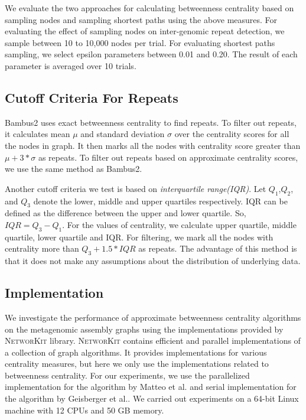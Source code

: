 \documentclass[runningheads,a4paper]{llncs}
\begin{document}
We evaluate the two approaches for calculating betweenness centrality based on sampling nodes and sampling shortest paths using the above measures.
For evaluating the effect of sampling nodes on inter-genomic repeat detection, we sample between 10 to 10,000 nodes per trial.
For evaluating shortest paths sampling, we select epsilon parameters between 0.01 and 0.20.
The result of each parameter is averaged over 10 trials.


\subsection*{Cutoff Criteria For Repeats}
Bambus2\cite{bambus} uses exact betweenness centrality to find repeats. To filter out repeats, it calculates mean $\mu$ and standard deviation $\sigma$ over the centrality scores for all the nodes in graph. It then marks all the nodes with centrality score greater than $\mu + 3*\sigma$ as repeats. To filter out repeats based on approximate centrality scores, we use the same method as Bambus2. 

Another cutoff criteria we test is based on \textit{interquartile range(IQR)}. Let $Q_{1}$,$Q_{2}$, and $Q_{3}$ denote the lower, middle and upper quartiles respectively. IQR can be defined as the difference between the upper and lower quartile. So, $IQR = Q_{3} - Q_{1}$. For the values of centrality, we calculate upper quartile, middle quartile, lower quartile and IQR. For filtering, we mark all the nodes with centrality more than $Q_{3} + 1.5*IQR$ as repeats. The advantage of this method is that it does not make any assumptions about the distribution of underlying data. 

\subsection*{Implementation}
We investigate the performance of approximate betweenness centrality algorithms on the metagenomic assembly graphs using the implementations provided by \textsc{NetworKit}\cite{networkit} library. \textsc{NetworKit} contains efficient and parallel implementations of a collection of graph algorithms.
It provides implementations for various centrality measures, but here we only use the implementations related to betweenness centrality. For our experiments, we use the parallelized implementation for the algorithm by Matteo et al.\cite{matteo} and serial implementation for the algorithm by Geisberger et al.\cite{sanders}.
We carried out experiments on a 64-bit Linux machine with 12 CPUs and 50 GB memory. 
\end{document}
